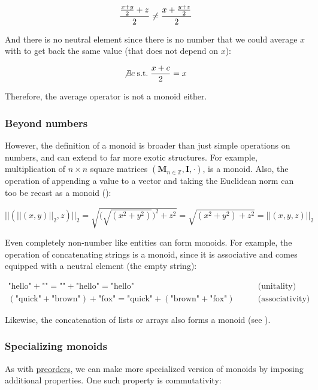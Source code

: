 \documentclass[
]{book}
\theoremstyle{definition}
\theoremstyle{definition}
\theoremstyle{definition}
\theoremstyle{definition}
\theoremstyle{remark}
\begin{document}
\[\frac{\frac{x + y}{2} + z}{2} \neq \frac{x + \frac{y + z}{2}}{2} \\\]

And there is no neutral element since there is no number that we could average \(x\) with to get back the same value (that does not depend on \(x\)):

\[\not\exists c \; \text{s.t.} \; \frac{x + c}{2} = x\]

Therefore, the average operator is not a monoid either.

\subsubsection{Beyond numbers}\label{beyond-numbers}

However, the definition of a monoid is broader than just simple operations on numbers, and can extend to far more exotic structures. For example, multiplication of \(n \times n\) square matrices \((\mathbf{M}_{n \in \mathbb{Z}}, \mathbf{I}, \cdot)\), is a monoid. Also, the operation of appending a value to a vector and taking the Euclidean norm can too be recast as a monoid ():

\[||(||(x, y)||_2, z)||_2 = \sqrt{\bigg(\sqrt{(x^2 + y^2)}\bigg)^2 + z^2} = \sqrt{(x^2 + y^2) + z^2} = ||(x, y, z)||_2\]

Even completely non-number like entities can form monoids. For example, the operation of concatenating strings is a monoid, since it is associative and comes equipped with a neutral element (the empty string):

\begin{align}
\text{"hello"} + \text{""} = \text{""} + \text{"hello"} = \text{"hello"} & \qquad \text{(unitality)} \\ 
(\text{"quick"} + \text{"brown"}) + \text{"fox"} = \text{"quick"} + (\text{"brown"} + \text{"fox"}) & \qquad \text{(associativity)}
\end{align}

Likewise, the concatenation of lists or arrays also forms a monoid (see ).

\subsubsection{Specializing monoids}\label{specializing-monoids}

As with \hyperref[Preorders]{preorders}, we can make more specialized version of monoids by imposing additional properties. One such property is commutativity:
\end{document}

